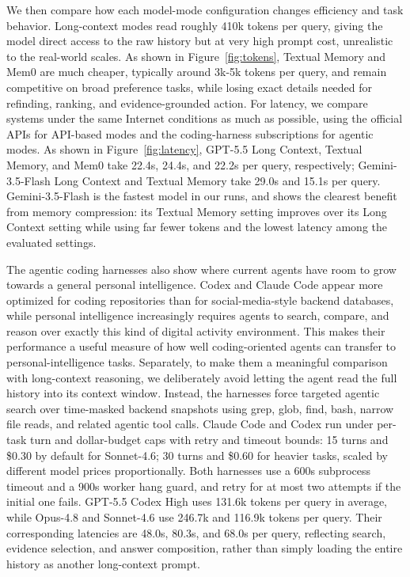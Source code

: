 \documentclass[]{fairmeta}
\begin{document}
We then compare how each model-mode configuration changes efficiency and task behavior. Long-context modes read roughly 410k tokens per query, giving the model direct access to the raw history but at very high prompt cost, unrealistic to the real-world scales. As shown in Figure~\ref{fig:tokens}, Textual Memory and Mem0 are much cheaper, typically around 3k-5k tokens per query, and remain competitive on broad preference tasks, while losing exact details needed for refinding, ranking, and evidence-grounded action. For latency, we compare systems under the same Internet conditions as much as possible, using the official APIs for API-based modes and the coding-harness subscriptions for agentic modes. As shown in Figure~\ref{fig:latency}, GPT-5.5 Long Context, Textual Memory, and Mem0 take 22.4s, 24.4s, and 22.2s per query, respectively; Gemini-3.5-Flash Long Context and Textual Memory take 29.0s and 15.1s per query. Gemini-3.5-Flash is the fastest model in our runs, and shows the clearest benefit from memory compression: its Textual Memory setting improves over its Long Context setting while using far fewer tokens and the lowest latency among the evaluated settings.

The agentic coding harnesses also show where current agents have room to grow towards a general personal intelligence. Codex and Claude Code appear more optimized for coding repositories than for social-media-style backend databases, while personal intelligence increasingly requires agents to search, compare, and reason over exactly this kind of digital activity environment. This makes their performance a useful measure of how well coding-oriented agents can transfer to personal-intelligence tasks. Separately, to make them a meaningful comparison with long-context reasoning, we deliberately avoid letting the agent read the full history into its context window. Instead, the harnesses force targeted agentic search over time-masked backend snapshots using grep, glob, find, bash, narrow file reads, and related agentic tool calls. Claude Code and Codex run under per-task turn and dollar-budget caps with retry and timeout bounds: 15 turns and \$0.30 by default for Sonnet-4.6; 30 turns and \$0.60 for heavier tasks, scaled by different model prices proportionally. Both harnesses use a 600s subprocess timeout and a 900s worker hang guard, and retry for at most two attempts if the initial one fails. GPT-5.5 Codex High uses 131.6k tokens per query in average, while Opus-4.8 and Sonnet-4.6 use 246.7k and 116.9k tokens per query. Their corresponding latencies are 48.0s, 80.3s, and 68.0s per query, reflecting search, evidence selection, and answer composition, rather than simply loading the entire history as another long-context prompt.
\end{document}

